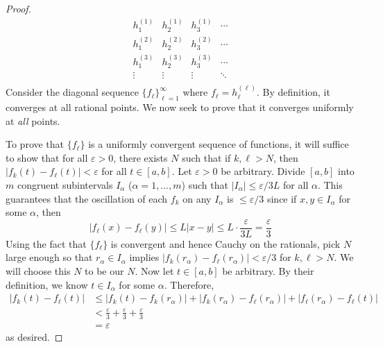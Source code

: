 \documentclass[../notes.tex]{subfiles}
\begin{document}
\begin{itemize}
\begin{proof}
        \begin{equation*}
            \begin{matrix}
                h_1^{(1)} & h_2^{(1)} & h_3^{(1)} & \cdots\\
                h_1^{(2)} & h_2^{(2)} & h_3^{(2)} & \cdots\\
                h_1^{(3)} & h_2^{(3)} & h_3^{(3)} & \cdots\\
                \vdots & \vdots & \vdots & \ddots\\
            \end{matrix}
        \end{equation*}
        Consider the diagonal sequence $\{f_\ell\}_{\ell=1}^\infty$ where $f_\ell=h_\ell^{(\ell)}$. By definition, it converges at all rational points. We now seek to prove that it converges uniformly at \emph{all} points.\par
        To prove that $\{f_\ell\}$ is a uniformly convergent sequence of functions, it will suffice to show that for all $\varepsilon>0$, there exists $N$ such that if $k,\ell>N$, then $|f_k(t)-f_\ell(t)|<\varepsilon$ for all $t\in[a,b]$. Let $\varepsilon>0$ be arbitrary. Divide $[a,b]$ into $m$ congruent subintervals $I_\alpha$ ($\alpha=1,\dots,m$) such that $|I_\alpha|\leq\varepsilon/3L$ for all $\alpha$. This guarantees that the oscillation of each $f_k$ on any $I_\alpha$ is $\leq\varepsilon/3$ since if $x,y\in I_\alpha$ for some $\alpha$, then
        \begin{equation*}
            |f_\ell(x)-f_\ell(y)| \leq L|x-y|
            \leq L\cdot\frac{\varepsilon}{3L}
            = \frac{\varepsilon}{3}
        \end{equation*}
        Using the fact that $\{f_\ell\}$ is convergent and hence Cauchy on the rationals, pick $N$ large enough so that $r_\alpha\in I_\alpha$ implies $|f_k(r_\alpha)-f_\ell(r_\alpha)|<\varepsilon/3$ for $k,\ell>N$. We will choose this $N$ to be our $N$. Now let $t\in[a,b]$ be arbitrary. By their definition, we know $t\in I_\alpha$ for some $\alpha$. Therefore,
        \begin{align*}
            |f_k(t)-f_\ell(t)| &\leq |f_k(t)-f_k(r_\alpha)|+|f_k(r_\alpha)-f_\ell(r_\alpha)|+|f_\ell(r_\alpha)-f_\ell(t)|\\
            &< \frac{\varepsilon}{3}+\frac{\varepsilon}{3}+\frac{\varepsilon}{3}\\
            &= \varepsilon
        \end{align*}
        as desired.\par

\end{proof}
\end{itemize}
\end{document}
